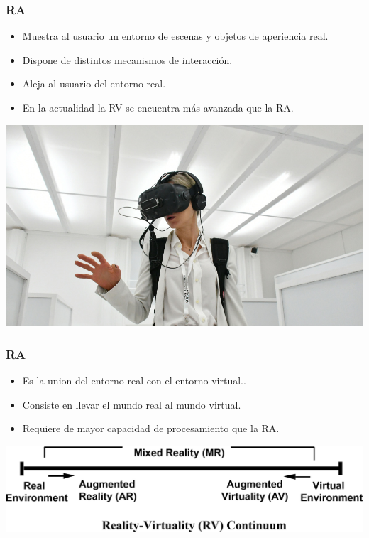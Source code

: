 \begin{frame}
	\frametitle{RA}
			\begin{itemize}
				\item {Muestra al usuario un entorno de escenas y objetos de aperiencia real.}
				\item {Dispone de distintos mecanismos de interacción.}
				\item {Aleja al usuario del entorno real.}
				\item {En la actualidad la RV se encuentra más avanzada que la RA.}
			\end{itemize}
		\endblock{}
			\begin{center}
				\includegraphics[width=0.50\linewidth]{Images/vr1}
			\end{center}
\end{frame}



\begin{frame}
	\frametitle{RA}
			\begin{itemize}
				\item {Es la union del entorno real con el entorno virtual.}.
				\item {Consiste en llevar el mundo real al mundo virtual.}
				\item {Requiere de mayor capacidad de procesamiento que la RA.}
			\end{itemize}
		\endblock{}
		\vfill 
			\begin{center}
				\includegraphics[width=0.8\linewidth]{Images/realidamixta}
			\end{center}
\end{frame}


